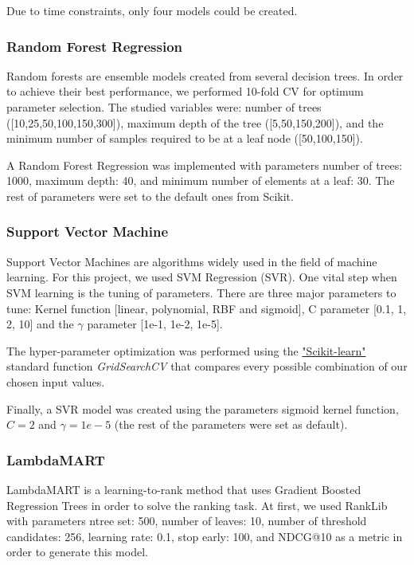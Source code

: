 \documentclass[9pt]{llncs}
\begin{document}
Due to time constraints, only four models could be created.


\subsubsection{Random Forest Regression}
Random forests are ensemble models created from several decision trees. In order to achieve their best performance, we performed 10-fold CV for optimum parameter selection. The studied variables were: number of trees ([10,25,50,100,150,300]),
maximum depth of the tree ([5,50,150,200]), and the minimum number of samples required to be at a leaf node ([50,100,150]).

A Random Forest Regression was implemented with parameters number of trees: 1000, maximum depth: 40, and minimum number of elements at a leaf: 30. The rest of parameters were set to the default ones from Scikit.

\subsubsection{Support Vector Machine}
Support Vector Machines are algorithms widely used in the field of machine learning. For this project, we used SVM Regression (SVR).
One vital step when SVM learning is the tuning of parameters. There are three major parameters to tune: Kernel function [linear, polynomial, RBF and sigmoid],  C parameter [0.1, 1, 2, 10] and the $\gamma$ parameter [1e-1, 1e-2, 1e-5].

The hyper-parameter optimization was performed using the  \href{http://scikit-learn.org/stable/)}{"Scikit-learn"} standard function \textit{GridSearchCV} \cite{Pedregosa2011Scikit-learn:Python} that compares every possible combination of our chosen input values.

Finally, a SVR model was created using the parameters sigmoid kernel function, $C=2$ and $\gamma=1e-5$ (the rest of the parameters were set as default).


\subsubsection{LambdaMART}
LambdaMART is a learning-to-rank method that uses Gradient Boosted Regression Trees in order to solve the ranking task.
At first, we used RankLib with parameters ntree set: 500, number of leaves: 10, number of threshold candidates: 256, learning rate: 0.1, stop early: 100, and NDCG@10 as a metric in order to generate this model.
\end{document}
